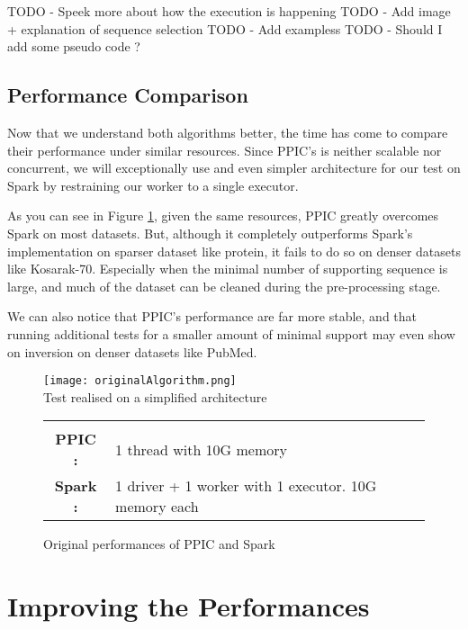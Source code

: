 \documentclass{eplmastersthesis}
\newcommand\danger{%
 \makebox[1.4em][c]{%
 \makebox[0pt][c]{\raisebox{.1em}{\small!}}%
 \makebox[0pt][c]{\color{red}\Large$\bigtriangleup$}}}%
\begin{document}
TODO - Speek more about how the execution is happening \newline
TODO - Add image  + explanation of sequence selection
TODO - Add exampless
TODO - Should I add some pseudo code ?

\subsection{Performance Comparison}

Now that we understand both algorithms better, the time has come to compare their performance under similar resources. Since PPIC's is neither scalable nor concurrent, we will exceptionally use and even simpler architecture for our test on Spark by restraining our worker to a single executor. \newline

As you can see in Figure \ref{fig:originalAlgorithmPerformances}, given the same resources, PPIC greatly overcomes Spark on most datasets. But, although it completely outperforms Spark's implementation on sparser dataset like protein, it fails to do so on denser datasets like Kosarak-70. Especially when the minimal number of supporting sequence is large, and much of the dataset can be cleaned during the pre-processing stage. \newline

We can also notice that PPIC's performance are far more stable, and that running additional tests for a smaller amount of minimal support may even show on inversion on denser datasets like PubMed.\newline

\begin{figure}[h]
  \centering
  \texttt{[image: originalAlgorithm.png]} \\
  \danger  Test realised on a simplified architecture \danger \\
  \begin{tabular}{c l}
  	 & \\
  	\textbf{PPIC :} & 1 thread  with 10G memory \\
  	\textbf{Spark :} & 1 driver + 1 worker with 1 executor. 10G memory each
  \end{tabular}
  \caption{Original performances of PPIC and Spark}
  \label{fig:originalAlgorithmPerformances}
\end{figure}

\section{Improving the Performances}
\end{document}
